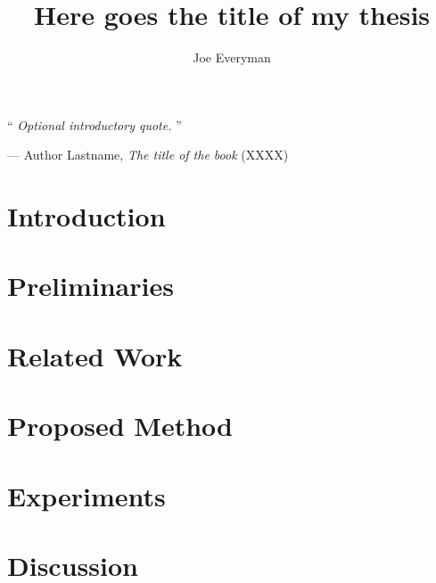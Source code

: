 \documentclass[10pt, twoside, a4paper, titlepage]{thesis}
\title{Here goes the title of my thesis}
\author{Joe Everyman}
\institute{[Institute]}
\begin{document}
	\frontmatter
	\maketitle
	\null\vspace{5cm}
	\begin{center}
        \parbox{10.5cm}{%
            \enquote{\itshape%
                Optional introductory quote.%
            }\par\vspace{1em}
            
            \begin{raggedleft}
                --- Author Lastname, \textit{The title of the book} (XXXX)\par
            \end{raggedleft}
        }
	\end{center}
	\cleardoubleoddemptypage
	\begin{abstract}
		
	\end{abstract}
	\cleardoubleoddemptypage
	\tableofcontents

	\mainmatter
	\section{Introduction\label{sec:introduction}}
	
	\section{Preliminaries\label{sec:preliminaries}}
	
	\section{Related Work\label{sec:related_work}}
	
	\section{Proposed Method\label{sec:proposed_method}}
	
	\section{Experiments\label{sec:experiments}}
	
	\section{Discussion\label{sec:discussion}}
	
\end{document}

